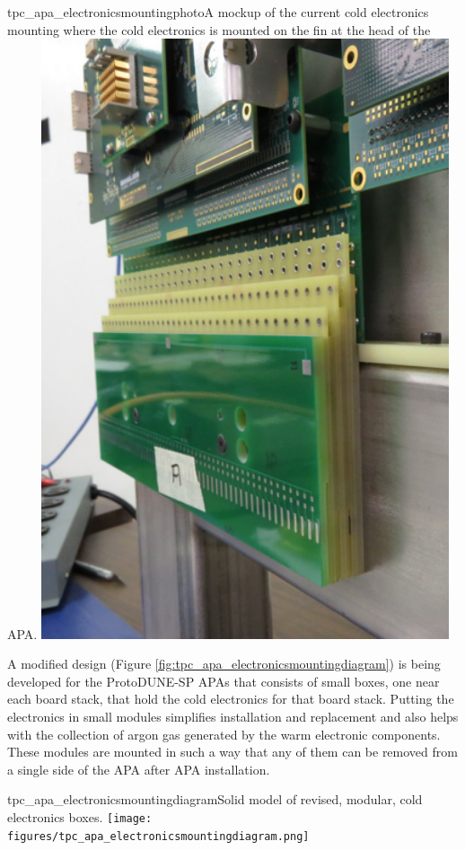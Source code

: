 \begin{cdrfigure}{tpc_apa_electronicsmountingphoto}{A mockup of the current cold electronics mounting where the cold electronics is mounted on the fin at the head of the APA.}
\includegraphics[width=0.9\textwidth]{figures/tpc_apa_electronicsmountingphoto.png} 
\end{cdrfigure}

A modified design (Figure \ref{fig:tpc_apa_electronicsmountingdiagram}) is being developed for the ProtoDUNE-SP APAs that consists of small boxes, one near each board stack, that hold the cold electronics for that board stack.  Putting the electronics in small modules simplifies installation and replacement and also helps with the collection of argon gas generated by the warm electronic components.  These modules are mounted in such a way that any of them can be removed from a single side of the APA after APA installation.

\begin{cdrfigure}{tpc_apa_electronicsmountingdiagram}{Solid model of revised, modular, cold electronics boxes.}
\texttt{[image: figures/tpc\_apa\_electronicsmountingdiagram.png]} 
\end{cdrfigure}

